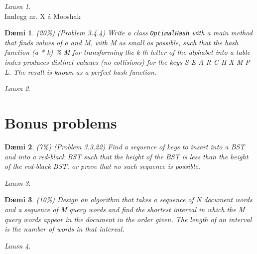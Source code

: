 \documentclass[11pt,a4paper,notitlepage]{amsart}
\newcommand{\problemtitle}{Dæmi}
\newcommand{\solutiontitle}{Lausn}
\theoremstyle{plain}
\newtheorem{problem}{\problemtitle}
\theoremstyle{remark}
\newtheorem*{solution}{\solutiontitle}
\begin{document}
\begin{solution}
\mbox{} \\
	Innlegg nr. X á Mooshak
\end{solution}
\mbox{}
\begin{problem} %
	(20\%) (Problem 3.4.4) Write a class \lstinline|OptimalHash|  with a main method that finds values of a and M, with M as small as possible, such that the hash function (a * k) \% M for transforming the k-th letter of the alphabet into a table index produces distinct valuues (no collisions) for the keys S E A R C H X M P L. The result is known as a perfect hash function.
\end{problem}

\begin{solution}
	\mbox{} \\
	
\end{solution}

\section*{Bonus problems}
\begin{problem} %
	(7\%) (Problem 3.3.22) Find a sequence of keys to insert into a BST and into a red-black BST such that the height of the BST is less than the height of the red-black BST, or prove that no such sequence is possible.
\end{problem}

\begin{solution}
	\mbox{} \\
	
\end{solution}
\mbox{}
\begin{problem} %
	(10\%) Design an algorithm that takes a sequence of N document words and a sequence of M query words and find the shortest interval in which the M query words appear in the document in the order given. The length of an interval is the number of words in that interval.
\end{problem}

\begin{solution}
	\mbox{} \\
	
\end{solution}
\end{document}

